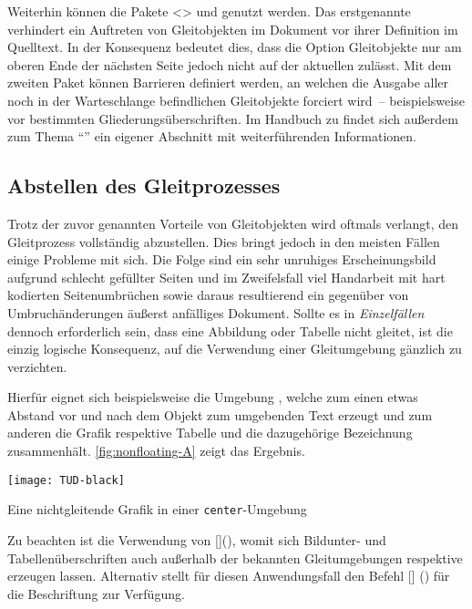 \documentclass[%
  english,ngerman,%
  cdgeometry=no,DIV=12,%
  automark,%
  listof=toc,%
]{tudscrartcl}
\begin{document}
Weiterhin können die Pakete <> und  genutzt 
werden. Das erstgenannte verhindert ein Auftreten von Gleitobjekten im Dokument 
vor ihrer Definition im Quelltext. In der Konsequenz bedeutet dies, dass die 
Option  Gleitobjekte nur am oberen Ende der nächsten Seite 
jedoch nicht auf der aktuellen zulässt. Mit dem zweiten Paket können Barrieren 
definiert werden, an welchen die Ausgabe aller noch in der Warteschlange 
befindlichen Gleitobjekte forciert wird~-- beispielsweise vor bestimmten 
Gliederungsüberschriften. Im Handbuch zu \TUDScript findet sich außerdem zum 
Thema \enquote{} 
ein eigener Abschnitt mit weiterführenden Informationen.


\subsection{Abstellen des Gleitprozesses}
Trotz der zuvor genannten Vorteile von Gleitobjekten wird oftmals verlangt, den 
Gleitprozess vollständig abzustellen. Dies bringt jedoch in den meisten Fällen 
einige Probleme mit sich. Die Folge sind ein sehr unruhiges Erscheinungsbild 
aufgrund schlecht gefüllter Seiten und im Zweifelsfall viel Handarbeit mit hart 
kodierten Seitenumbrüchen sowie daraus resultierend ein gegenüber von 
Umbruchänderungen äußerst anfälliges Dokument. Sollte es in \emph{Einzelfällen} 
dennoch erforderlich sein, dass eine Abbildung oder Tabelle nicht gleitet, ist 
die einzig logische Konsequenz, auf die Verwendung einer Gleitumgebung gänzlich 
zu verzichten. 

Hierfür eignet sich beispielsweise die Umgebung , welche 
zum einen etwas Abstand vor und nach dem Objekt zum umgebenden Text erzeugt 
und zum anderen die Grafik respektive Tabelle und die dazugehörige Bezeichnung 
zusammenhält. \autoref{fig:nonfloating-A} zeigt das Ergebnis.
%
\begin{Hint}
\begin{center}
\captionsetup{type=figure}
\texttt{[image: TUD-black]}
\caption{Eine nichtgleitende Grafik in einer \texttt{center}-Umgebung}
\label{fig:nonfloating-A}
\end{center}

\end{Hint}
\InputCode\noindent

Zu beachten ist die Verwendung von 
[](), womit
sich Bildunter- und Tabellenüberschriften auch außerhalb der bekannten 
Gleitumgebungen  respektive  erzeugen
lassen. Alternativ stellt \KOMAScript{} für diesen Anwendungsfall den Befehl 
[]%
() für die Beschriftung zur Verfügung. 
\end{document}
